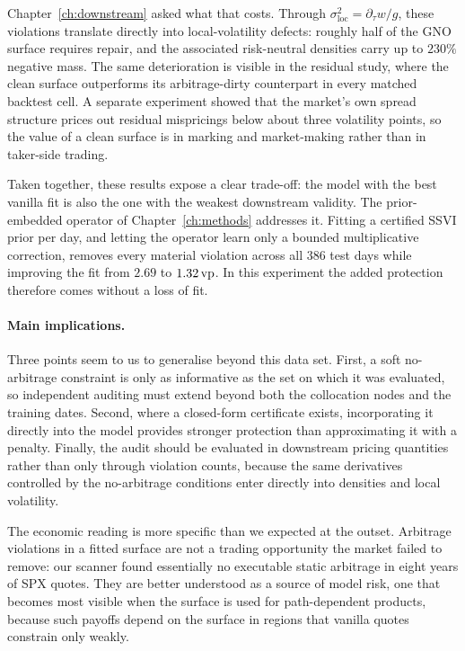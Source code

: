 Chapter~\ref{ch:downstream} asked what that costs. Through
$\sigma_{\mathrm{loc}}^2=\partial_\tau w/g$, these violations translate directly into
local-volatility defects: roughly half of the GNO surface requires repair, and the associated
risk-neutral densities carry up to $230\%$ negative mass. The same deterioration is visible in
the residual study, where the clean surface outperforms its arbitrage-dirty counterpart in every
matched backtest cell. A separate
experiment showed that the market's own spread structure prices out residual mispricings below
about three volatility points, so the value of a clean surface is in marking and market-making
rather than in taker-side trading.

Taken together, these results expose a clear trade-off: the model with the best vanilla fit is
also the one with the weakest downstream validity. The prior-embedded operator of
Chapter~\ref{ch:methods} addresses it. Fitting a certified SSVI prior per day, and letting the
operator learn only a bounded multiplicative correction, removes every material violation across
all $386$ test days while improving the fit from $2.69$ to $1.32\,\text{vp}$. In this experiment the
added protection therefore comes without a loss of fit.

\paragraph{Main implications.} Three points seem to us to generalise beyond this data set.
First, a soft no-arbitrage constraint is only as informative as the set on which it was
evaluated, so independent auditing must extend beyond both the collocation nodes and the
training dates. Second, where a closed-form certificate exists, incorporating it directly into
the model provides stronger protection than approximating it with a penalty. Finally, the audit
should be evaluated in downstream pricing quantities rather than only through violation counts,
because the same derivatives controlled by the no-arbitrage conditions enter directly into
densities and local volatility.

The economic reading is more specific than we expected at the outset. Arbitrage violations in a
fitted surface are not a trading opportunity the market failed to remove: our scanner found
essentially no executable static arbitrage in eight years of SPX quotes. They are better
understood as a source of model risk, one that becomes most visible when the surface is used for
path-dependent products, because such payoffs depend on the surface in regions that vanilla
quotes constrain only weakly.


